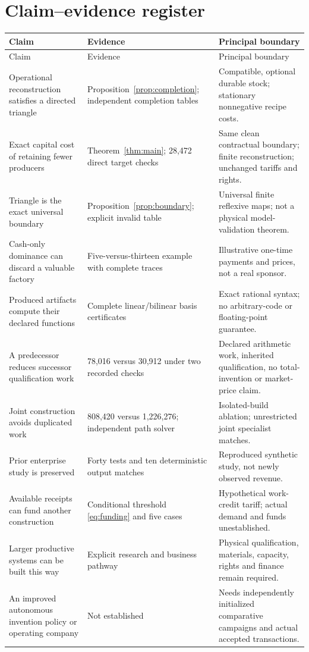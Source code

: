 \documentclass[11pt,letterpaper]{article}
\theoremstyle{definition}\newtheorem{definition}[theorem]{Definition}
\theoremstyle{remark}\newtheorem{remark}[theorem]{Remark}
\begin{document}
\section{Claim--evidence register}
\small
\begin{longtable}{@{}P{.29\linewidth}P{.34\linewidth}P{.31\linewidth}@{}}\toprule
Claim & Evidence & Principal boundary\\\midrule\endfirsthead
\toprule Claim & Evidence & Principal boundary\\\midrule\endhead
Operational reconstruction satisfies a directed triangle & Proposition~\ref{prop:completion}; independent completion tables & Compatible, optional durable stock; stationary nonnegative recipe costs.\\[4pt]
Exact capital cost of retaining fewer producers & Theorem~\ref{thm:main}; 28,472 direct target checks & Same clean contractual boundary; finite reconstruction; unchanged tariffs and rights.\\[4pt]
Triangle is the exact universal boundary & Proposition~\ref{prop:boundary}; explicit invalid table & Universal finite reflexive maps; not a physical model-validation theorem.\\[4pt]
Cash-only dominance can discard a valuable factory & Five-versus-thirteen example with complete traces & Illustrative one-time payments and prices, not a real sponsor.\\[4pt]
Produced artifacts compute their declared functions & Complete linear/bilinear basis certificates & Exact rational syntax; no arbitrary-code or floating-point guarantee.\\[4pt]
A predecessor reduces successor qualification work & 78,016 versus 30,912 under two recorded checks & Declared arithmetic work, inherited qualification, no total-invention or market-price claim.\\[4pt]
Joint construction avoids duplicated work & 808,420 versus 1,226,276; independent path solver & Isolated-build ablation; unrestricted joint specialist matches.\\[4pt]
Prior enterprise study is preserved & Forty tests and ten deterministic output matches & Reproduced synthetic study, not newly observed revenue.\\[4pt]
Available receipts can fund another construction & Conditional threshold \eqref{eq:funding} and five cases & Hypothetical work-credit tariff; actual demand and funds unestablished.\\[4pt]
Larger productive systems can be built this way & Explicit research and business pathway & Physical qualification, materials, capacity, rights and finance remain required.\\[4pt]
An improved autonomous invention policy or operating company & Not established & Needs independently initialized comparative campaigns and actual accepted transactions.\\\bottomrule
\end{longtable}
\normalsize
\end{document}
